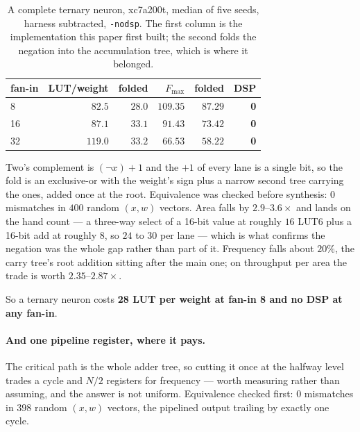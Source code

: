 \begin{table}[t]\centering
\caption{A complete ternary neuron, xc7a200t, median of five seeds, harness
subtracted, \texttt{-nodsp}. The first column is the implementation this paper
first built; the second folds the negation into the accumulation tree, which is
where it belonged.}
\label{tab:node}
\begin{tabular}{lrrrrr}
\toprule
fan-in & LUT/weight & folded & $F_{\max}$ & folded & DSP \\
\midrule
8  & $82.5$ & $\mathbf{28.0}$ & $109.35$ & $87.29$ & \textbf{0} \\
16 & $87.1$ & $\mathbf{33.1}$ & $91.43$ & $73.42$ & \textbf{0} \\
32 & $119.0$ & $\mathbf{33.2}$ & $66.53$ & $58.22$ & \textbf{0} \\
\bottomrule
\end{tabular}
\end{table}

Two's complement is $(\lnot x)+1$ and the $+1$ of every lane is a single bit, so
the fold is an exclusive-or with the weight's sign plus a narrow second tree
carrying the ones, added once at the root. Equivalence was checked before
synthesis: $0$ mismatches in $400$ random $(x,w)$ vectors. Area falls by
$2.9$--$3.6\times$ and lands on the hand count --- a three-way select of a
16-bit value at roughly $16$ LUT6 plus a 16-bit add at roughly $8$, so $24$ to
$30$ per lane --- which is what confirms the negation was the whole gap rather
than part of it. Frequency falls about $20\%$, the carry tree's root addition
sitting after the main one; on throughput per area the trade is worth
$2.35$--$2.87\times$.

So a ternary neuron costs \textbf{28 LUT per weight at fan-in 8 and no DSP at
any fan-in}.

\paragraph{And one pipeline register, where it pays.} The critical path is the
whole adder tree, so cutting it once at the halfway level trades a cycle and
$N/2$ registers for frequency --- worth measuring rather than assuming, and the
answer is not uniform. Equivalence checked first: $0$ mismatches in $398$ random
$(x,w)$ vectors, the pipelined output trailing by exactly one cycle.

